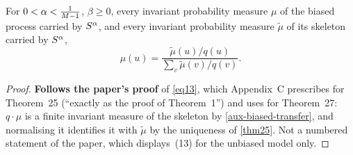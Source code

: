 \begin{lemma}
  \label{aux-biased-eq13}
  \leanok
  For $0 < \alpha < \tfrac{1}{M-1}$, $\beta \ge 0$, every invariant probability
  measure $\mu$ of the biased process carried by $S^\alpha$, and every invariant
  probability measure $\tilde{\mu}$ of its skeleton carried by $S^\alpha$,
  \[
    \mu(u) = \frac{\tilde{\mu}(u)/q(u)}{\sum_{v} \tilde{\mu}(v)/q(v)} .
  \]
\end{lemma}
\begin{proof}
  \leanok
  \textbf{Follows the paper's proof} of \ref{eq13}, which Appendix~C prescribes
  for Theorem~25 (``exactly as the proof of Theorem~1'') and uses for
  Theorem~27: $q \cdot \mu$ is a finite invariant measure of the skeleton by
  \ref{aux-biased-transfer}, and normalising it identifies it with
  $\tilde{\mu}$ by the uniqueness of \ref{thm25}.  Not a numbered statement of
  the paper, which displays~(13) for the unbiased model only.
\end{proof}

